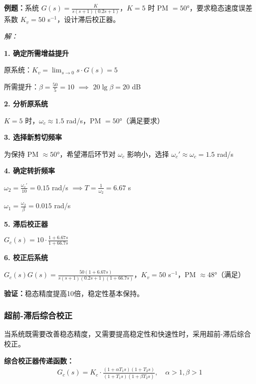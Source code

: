 \vspace{0.3cm}
\textbf{例题：}系统 $G(s) = \frac{K}{s(s+1)(0.2s+1)}$，$K=5$ 时 PM $= 50°$，要求稳态速度误差系数 $K_v = 50$ s$^{-1}$，设计滞后校正器。

\textit{解：}

\textbf{1. 确定所需增益提升}

原系统：$K_v = \lim_{s\to 0} s \cdot G(s) = 5$

所需提升：$\beta = \frac{50}{5} = 10$ $\implies$ $20\lg\beta = 20$ dB

\textbf{2. 分析原系统}

$K = 5$ 时，$\omega_c \approx 1.5$ rad/s，PM $= 50°$（满足要求）

\textbf{3. 选择新剪切频率}

为保持 PM $\approx 50°$，希望滞后环节对 $\omega_c$ 影响小，选择 $\omega_c' \approx \omega_c = 1.5$ rad/s

\textbf{4. 确定转折频率}

$\omega_2 = \frac{\omega_c'}{10} = 0.15$ rad/s $\implies T = \frac{1}{\omega_2} = 6.67$ s

$\omega_1 = \frac{\omega_2}{\beta} = 0.015$ rad/s

\textbf{5. 滞后校正器}

$G_c(s) = 10 \cdot \frac{1 + 6.67s}{1 + 66.7s}$

\textbf{6. 校正后系统}

$G_c(s)G(s) = \frac{50(1+6.67s)}{s(s+1)(0.2s+1)(1+66.7s)}$，$K_v = 50$ s$^{-1}$，PM $\approx 48°$（满足）

\textbf{验证：}稳态精度提高10倍，稳定性基本保持。

\subsubsection{超前-滞后综合校正}

当系统既需要改善稳态精度，又需要提高稳定性和快速性时，采用超前-滞后综合校正。

\textbf{综合校正器传递函数：}
\begin{align*}
G_c(s) = K_c \cdot \frac{(1 + \alpha T_1 s)(1 + T_2 s)}{(1 + T_1 s)(1 + \beta T_2 s)}, \quad \alpha > 1, \beta > 1
\end{align*}

